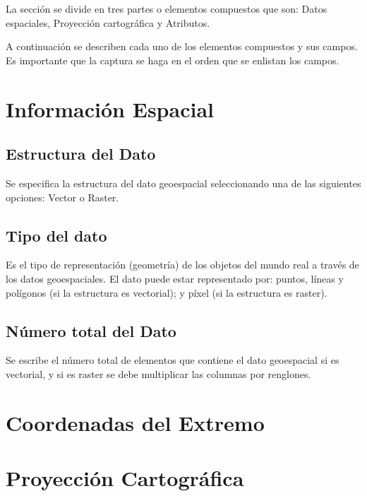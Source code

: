 \documentclass[twoside]{book}
\begin{document}
La sección se divide en tres partes o elementos compuestos que son: Datos espaciales, Proyección cartográfica y Atributos.

A continuación se describen cada uno de los elementos compuestos y sus campos. Es importante que la captura se haga en el orden que se enlistan los campos.

\section{Información Espacial}

\subsection{Estructura del Dato}
Se especifica la estructura del dato geoespacial seleccionando una de las siguientes opciones: Vector o Raster.

\subsection{Tipo del dato}
Es el tipo de representación (geometría) de los objetos del mundo real a través de los datos geoespaciales. El dato puede estar representado por: puntos, líneas y polígonos (si la estructura es vectorial); y píxel (si la estructura es raster).

\subsection{Número total del Dato}
Se escribe el número total de elementos que contiene el dato geoespacial si es vectorial, y si es raster se debe multiplicar las columnas por renglones.

\section{Coordenadas del Extremo}

\section{Proyección Cartográfica}
\end{document}
